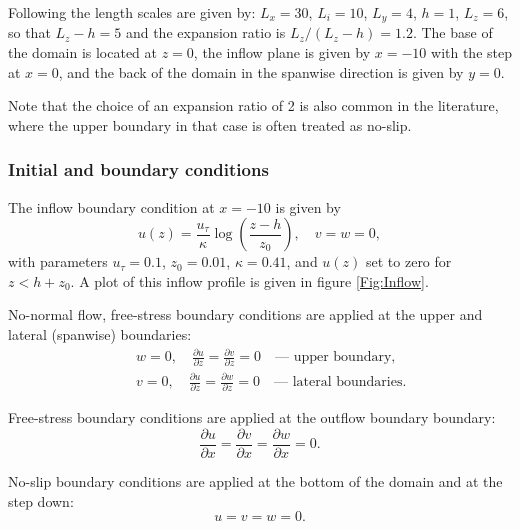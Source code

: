 Following \cite{le1997} the length scales are given by: $L_x=30$, $L_i=10$, $L_y=4$, $h=1$, $L_z=6$,
so that $L_z-h=5$ and the expansion ratio is $L_z/(L_z-h)=1.2$.
The base of the domain is located at $z=0$, the inflow plane is given by $x=-10$ with the step
at $x=0$, and the back of the domain in the spanwise direction is given by $y=0$.

Note that the choice of an expansion ratio
of 2 is also common in the literature, where the upper boundary in that case is often treated as no-slip.


\subsubsection{Initial and boundary conditions}
The inflow boundary condition at $x=-10$ is given by
\begin{equation}
u(z) = \frac{u_{\tau}}{\kappa} \log \left(\frac{z - h}{z_0}\right), \quad v = w = 0,
\end{equation}
with parameters $u_{\tau} = 0.1$, $z_0 = 0.01$, $\kappa = 0.41$, and $u(z)$ set to zero for
$z<h+z_0$.
A plot of this inflow profile is given in figure \ref{Fig:Inflow}.


No-normal flow, free-stress boundary conditions are applied at the upper and lateral
(spanwise) boundaries:
\begin{eqnarray*}
&&w=0,\quad \frac{\partial u}{\partial z} = \frac{\partial v}{\partial z} = 0 \quad\textrm{--- upper boundary},\\
&&v=0,\quad \frac{\partial u}{\partial z} = \frac{\partial w}{\partial z} = 0 \quad\textrm{--- lateral boundaries}.
\end{eqnarray*}

Free-stress boundary conditions are applied at the outflow boundary boundary:
\begin{equation*}
\frac{\partial u}{\partial x} = \frac{\partial v}{\partial x} = \frac{\partial w}{\partial x} = 0.
\end{equation*}

No-slip boundary conditions are applied at the bottom of the domain and at the step down:
\begin{equation*}
u=v=w=0.
\end{equation*}




